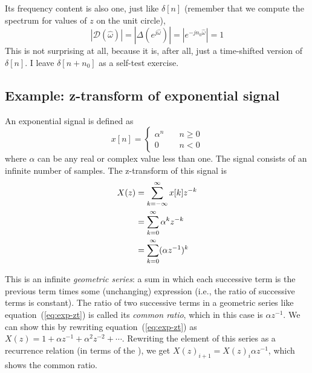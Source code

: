 Its frequency content is also one, just like $\delta[n]$ (remember
that we compute the spectrum for values of $z$ on the unit circle),
\begin{equation}
|\mathcal{D}(\hat{\omega})|=|\Delta(e^{j\hat{\omega}})|=|e^{-jn_0\hat{\omega}}|=1
\end{equation}
This is not surprising at all, because it is, after all, just a
time-shifted version of $\delta[n]$. I leave $\delta[n+n_0]$ as a
self-test exercise.


\subsection{Example: z-transform of exponential signal}

An exponential signal is defined as 
\begin{equation}
x[n] = \left\{\begin{array}{ll}
                        \alpha^n & \quad  n \ge 0 \\
                        0        & \quad n < 0
          \end{array}\right.
\label{eq:zt-expof}
\end{equation}
where $\alpha$ can be any real or complex value less than one. The
signal consists of an infinite number of samples. The z-transform of
this signal is
\begin{align}
X(z) &= \sum_{k=-\infty}^{\infty} x[k] z^{-k} \notag\\
     &= \sum_{k=0}^{\infty}\alpha^k  z^{-k} \notag\\
     &= \sum_{k=0}^{\infty}(\alpha z^{-1})^k
\label{eq:exp-zt}
\end{align}

This is an infinite \emph{geometric series}: a sum in which each
successive term is the previous term times some (unchanging)
expression (i.e., the ratio of successive terms is constant).
 The ratio of two successive terms in a
geometric series like 
equation~(\ref{eq:exp-zt}) is called its \emph{common ratio}, which in
this case is $\alpha z^{-1}$. We can show this by rewriting
equation~(\ref{eq:exp-zt}) as $X(z) = 1 + \alpha z^{-1} + \alpha^{2}
z^{-2} + \cdots$. Rewriting the  element of this
series as a recurrence relation (in terms of the ),
we get $X(z)_{i+1} = X(z)_i \alpha z^{-1}$, which shows the common ratio.
  
